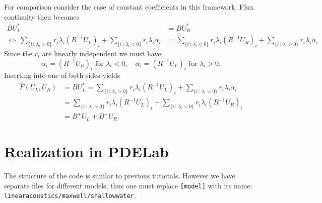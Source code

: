 \documentclass[a4paper,12pt]{article}
\theoremstyle{definition}
\theoremstyle{definition}
\begin{document}
For comparison consider the case of constant coefficients in this framework.
Flux continuity then becomes
\begin{align*}
B U_L^\ast &= B U_R^\ast\\
\Leftrightarrow\
\sum_{\{i \,:\, \lambda_i> 0\}} r_i \lambda_i (R^{-1} U_L)_i + \sum_{\{i \,:\, \lambda_i<0\}} r_i \lambda_i \alpha_i
&= \sum_{\{i \,:\, \lambda_i< 0\}} r_i \lambda_i (R^{-1} U_R)_i + \sum_{\{i \,:\, \lambda_i>0\}} r_i \lambda_i \alpha_i
\end{align*}
Since the $r_i$ are linearly independent we must have
\begin{equation*}
\alpha_i = (R^{-1} U_R)_i\text{ for $\lambda_i<0$}, \quad
\alpha_i = (R^{-1} U_L)_i\text{ for $\lambda_i>0$}.
\end{equation*}
Inserting into one of both sides yields
\begin{equation*}
\begin{split}
\hat F(U_L,U_R) &= B U_L^\ast = \sum_{\{i \,:\, \lambda_i> 0\}} r_i \lambda_i (R^{-1} U_L)_i + \sum_{\{i \,:\, \lambda_i<0\}} r_i \lambda_i \alpha_i\\
&= \sum_{\{i \,:\, \lambda_i> 0\}} r_i \lambda_i (R^{-1} U_L)_i + \sum_{\{i \,:\, \lambda_i<0\}} r_i \lambda_i (R^{-1} U_R)_i\\
&= B^+U_L + B^- U_R .
\end{split}
\end{equation*}


\section{Realization in PDELab}

The structure of the code is similar to previous tutorials. However we have separate files for different models, thus one must replace \lstinline{[model]} with its name: \lstinline{linearacoustics/maxwell/shallowwater}.
\end{document}
